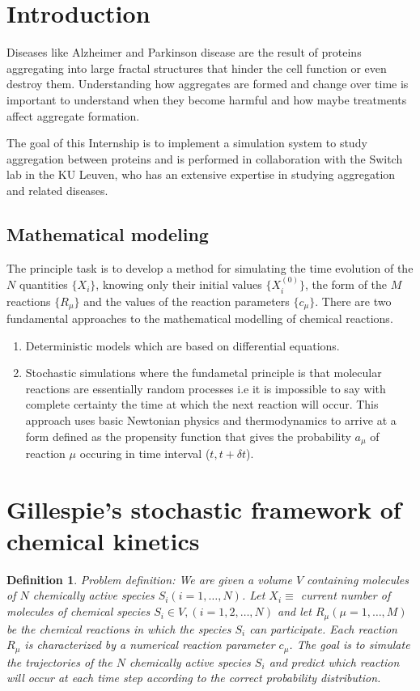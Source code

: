 \documentclass[11pt,a4paper]{article}
\newtheorem{defn}[theorem]{Definition}
\begin{document}


\tableofcontents \pagebreak

\section{Introduction}
Diseases like Alzheimer and Parkinson disease are the result of proteins aggregating into large fractal structures that hinder the cell function or even destroy them. Understanding how aggregates are formed and change over time is important to understand when they become harmful and how maybe treatments affect aggregate formation.

The goal of this Internship is to implement a simulation system to study aggregation between proteins and  is performed in collaboration with the Switch lab in the KU Leuven, who has an extensive expertise in studying aggregation and related diseases.

\subsection{Mathematical modeling}
The principle task is to develop a method for simulating the time evolution of the $N$ quantities $\{X_{i}\}$, knowing only their initial values $\{X_{i}^{(0)}\}$, the form of the $M$ reactions $\{R_{\mu}\}$ and the values of the reaction parameters $\{c_{\mu}\}$.
There are two fundamental approaches to the mathematical modelling of chemical reactions.
\begin{enumerate}
  \item Deterministic models which are based on differential equations.
  \item Stochastic simulations where the fundametal principle is that molecular reactions are essentially random processes i.e it is impossible to say with complete certainty the time at which the next reaction will occur. This approach uses basic Newtonian physics and thermodynamics to arrive at a form defined as the propensity function that gives the probability $a_\mu$ of reaction $\mu$ occuring in time interval ($t, t+\delta t$).
\end{enumerate}

\section{Gillespie's stochastic framework of chemical kinetics}
\begin{defn}{Problem definition:}
We are given a volume $V$ containing molecules of $N$ chemically active species $S_{i}(i = 1, \dots, N)$. Let $X_{i} \equiv$ current number of molecules of chemical species $S_{i} \in V, (i = 1, 2, \dots, N)$ and let $R_{\mu} (\mu = 1, \dots, M)$ be the chemical reactions in which the species $S_{i}$ can participate. Each reaction $R_{\mu}$ is characterized by a numerical reaction parameter $c_{\mu}$. The goal is to simulate the trajectories of the $N$ chemically active species $S_i$ and predict which reaction will occur at each time step according to the correct probability distribution.
\end{defn}
\end{document}
